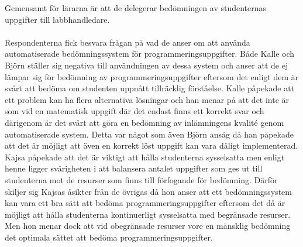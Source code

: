 \documentclass[a4paper,11pt]{article}
\begin{document}
{Gemensamt för lärarna är att de delegerar bedömningen av studenternas uppgifter till labbhandledare. 
\\
\\
Respondenterna fick besvara frågan på vad de anser om att använda automatiserade bedömningssystem för programmeringsuppgifter. Både Kalle och Björn ställer sig negativa till användningen av dessa system och anser att de ej lämpar sig för bedömning av programmeringsuppgifter eftersom det enligt dem är svårt att bedöma om studenten uppnått tillräcklig förståelse.
Kalle påpekade att ett problem kan ha flera alternativa lösningar och han menar på att det inte är som vid en matematisk uppgift där det endast finns ett korrekt svar och därigenom är det svårt att göra en bedömning av inlämningens kvalité genom automatiserade system. Detta var något som även Björn ansåg då han påpekade att det är möjligt att även en korrekt löst uppgift kan vara dåligt implementerad.
Kajsa påpekade att det är viktigt att hålla studenterna sysselsatta men enligt henne ligger svårigheten i att balansera antalet uppgifter som ges ut till studenterna mot de resurser som finns till förfogande för bedömning. Därför skiljer sig Kajsas åsikter från de övrigas då hon anser att ett bedömningssystem kan vara ett bra sätt att bedöma programmeringsuppgifter eftersom det då är möjligt att hålla studenterna kontinuerligt sysselsatta med begränsade resurser. Men hon menar dock att vid obegränsade resurser vore en mänsklig bedömning det optimala sättet att bedöma programmeringsuppgifter.

}
\end{document}
